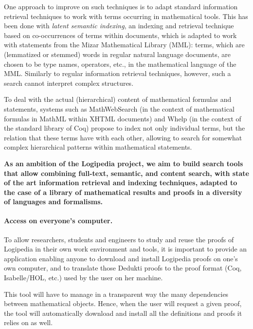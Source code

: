 One approach to improve on such techniques is to
adapt standard information retrieval techniques to work with terms
occurring in mathematical tools. This has been done\cite{DBLP:conf/mkm/Cairns04}
with \emph{latent semantic indexing}, an
indexing and retrieval technique based on co-occurrences of terms within
documents, which is adapted to work with statements from the Mizar
Mathematical Library (MML): terms, which are (lemmatized or stemmed)
words in regular natural language documents, are chosen to be type names,
operators, etc., in the mathematical language of the MML. Similarly to
regular information retrieval techniques, however, such a search cannot
interpret complex structures.

To deal with the actual (hierarchical) content of mathematical formulas
and statements, systems such as
MathWebSearch\cite{DBLP:conf/aisc/KohlhaseMP12} (in the context of
mathematical formulas in MathML within XHTML documents) and
Whelp\cite{DBLP:conf/types/AspertiGCTZ04} (in the context of the standard
library of Coq) propose to index not only individual terms, but the
relation that these terms have with each other, allowing to search for
somewhat complex hierarchical patterns within mathematical statements.

{\bf As an ambition of the Logipedia project, we aim to build search
  tools that allow combining full-text, semantic, and content search,
  with state of the art information retrieval and indexing techniques,
  adapted to the case of a library of mathematical results and proofs
  in a diversity of languages and formalisms.}

\paragraph*{Access on everyone's computer.}

To allow researchers, students and engineers to study and
reuse the proofs of Logipedia in their own work environment
and tools, it is important to provide an application enabling anyone
to download and install Logipedia proofs on one's own computer, and to
translate those Dedukti proofs to the proof format (Coq, Isabelle/HOL,
etc.) used by the user on her machine.

This tool will have to manage in a transparent way the many
dependencies between mathematical objects. Hence, when the user will
request a given proof, the tool will automatically download and
install all the definitions and proofs it relies on as well.

